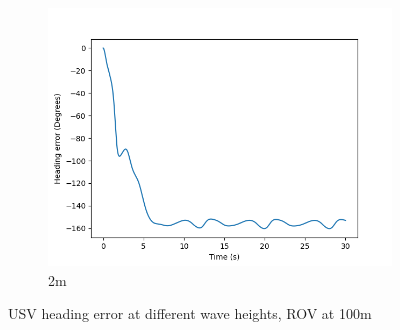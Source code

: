 \documentclass[class=article, crop=false]{standalone}
\begin{document}
\begin{figure}
\begin{subfigure}[b]{0.48\textwidth}
        \includegraphics{scenario1/rov-100m/2.0m/usv_heading_error_uncontrolled}
        \caption{2m}
        \label{}
    \end{subfigure}

    \caption{USV heading error at different wave heights, ROV at 100m}
\end{figure}
\end{document}
